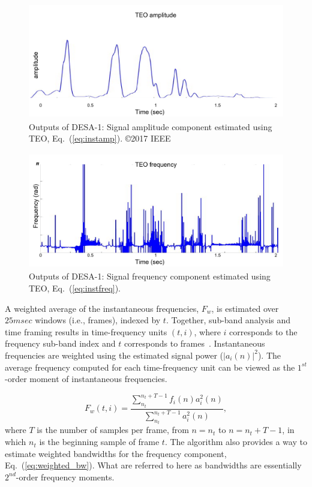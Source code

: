 {\vspace{1.0mm}
\begin{figure}[h!]
	\centering
	\includegraphics[height=2in, width=1\textwidth]{figures/teo_amp}
	\caption{ Outputs of DESA-1: Signal amplitude component estimated using TEO, Eq.~(\ref{eq:instamp}). \copyright 2017 IEEE}
	\label{fig:ch2_inputamplitude}
\end{figure}

\begin{figure}[h!]
	\centering
	\includegraphics[height=2in, width=1\textwidth]{figures/teo_freq}
	\caption{ Outputs of DESA-1: Signal frequency component estimated using TEO,  Eq.~(\ref{eq:instfreq}).}
	\label{fig:ch2_inputfrequency}
\end{figure}

A weighted average of the instantaneous frequencies, $F_w$, is estimated over $25msec$ windows (i.e., frames), indexed by $t$. 
Together, sub-band analysis and time framing results in time-frequency units $(t,i)$, where $i$ corresponds to the frequency sub-band index and $t$ corresponds to frames~\cite{cohenlee90}.
Instantaneous frequencies are weighted using the estimated signal power ($|a_i(n)|^2$). 
The average frequency computed for each time-frequency unit can be viewed as the $1^{st}$-order moment of instantaneous frequencies.  


\begin{equation}
\label{eq:weighted_f}
F_w(t,i) = \frac{\sum_{n_t}^{n_t+T - 1}f_i(n)a_i^2(n)}{\sum_{n_t}^{n_t+T - 1}a_i^2(n)},
\end{equation}
where $T$ is the number of samples per frame, from $n = n_t$ to $n = n_t+T - 1$, in which $n_t$ is the beginning sample of frame $t$. 
The algorithm also provides a way to estimate weighted bandwidths for the frequency component, Eq.~(\ref{eq:weighted_bw}). 
What are referred to here as bandwidths are essentially $2^{nd}$-order frequency moments. 

}
